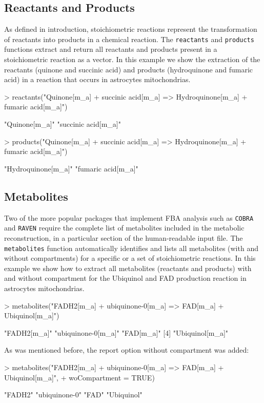 \subsection*{Reactants and Products}
As defined in introduction, stoichiometric reactions represent the transformation of reactants into products in a chemical reaction. The \texttt{reactants} and \texttt{products} functions extract and return all reactants and products present in a stoichiometric reaction  as a vector. In this example we show the extraction of the reactants (quinone and succinic acid) and products (hydroquinone and fumaric acid) in a reaction that occurs in astrocytes mitochondrias.
\begin{Schunk}
\begin{Sinput}
> reactants("Quinone[m_a] + succinic acid[m_a] => Hydroquinone[m_a] + fumaric acid[m_a]")
\end{Sinput}
\begin{Soutput}
[1] "Quinone[m_a]"       "succinic acid[m_a]"
\end{Soutput}
\begin{Sinput}
> products("Quinone[m_a] + succinic acid[m_a] => Hydroquinone[m_a] + fumaric acid[m_a]")
\end{Sinput}
\begin{Soutput}
[1] "Hydroquinone[m_a]" "fumaric acid[m_a]"
\end{Soutput}
\end{Schunk}
\subsection*{Metabolites}
Two of the more popular packages that implement FBA analysis such as \texttt{COBRA} \cite{Becker2007} and \texttt{RAVEN} \cite{Agren2013} require the complete list of metabolites included in the metabolic reconstruction, in a particular section of the human-readable input file. The \texttt{metabolites} function automatically identifies and lists  all metabolites (with and without compartments) for a specific or a set of stoichiometric reactions.  In this example we show how to extract all metabolites (reactants and products) with and without compartment for the Ubiquinol and FAD production reaction in astrocytes mitochondrias.
\begin{Schunk}
\begin{Sinput}
> metabolites("FADH2[m_a] + ubiquinone-0[m_a] => FAD[m_a] + Ubiquinol[m_a]")
\end{Sinput}
\begin{Soutput}
[1] "FADH2[m_a]"        "ubiquinone-0[m_a]" "FAD[m_a]"
[4] "Ubiquinol[m_a]"
\end{Soutput}
As was mentioned before, the report option without compartment was added:
\begin{Sinput}
> metabolites("FADH2[m_a] + ubiquinone-0[m_a] => FAD[m_a] + Ubiquinol[m_a]",
+             woCompartment = TRUE)
\end{Sinput}
\begin{Soutput}
[1] "FADH2"        "ubiquinone-0" "FAD"          "Ubiquinol"
\end{Soutput}
\end{Schunk}
